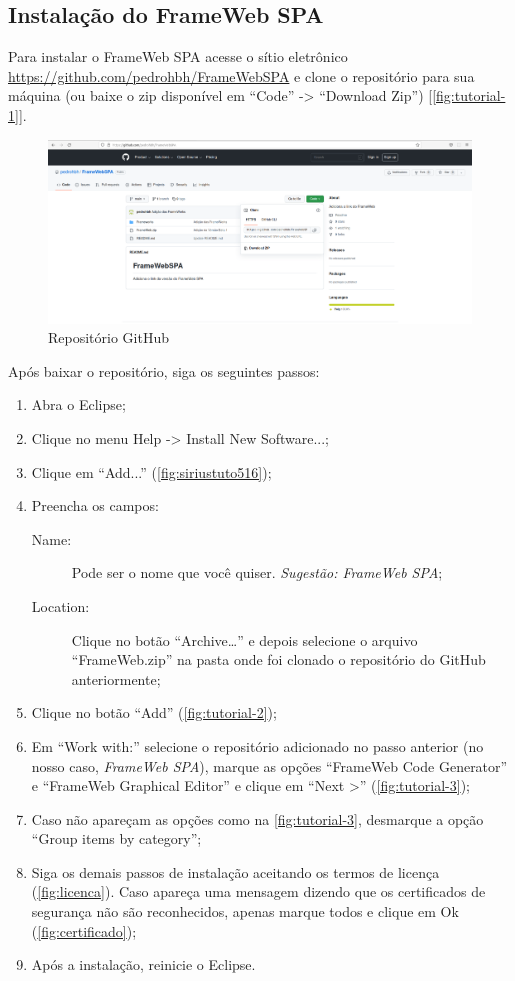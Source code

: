 \documentclass[
article,			%
11pt,				%
oneside,			%
a4paper,			%
english,			%
brazil,				%
sumario=tradicional
]{abntex2}
\begin{document}
\subsection{Instalação do FrameWeb SPA}
Para instalar o FrameWeb SPA acesse o sítio eletrônico \url{https://github.com/pedrohbh/FrameWebSPA} e clone o repositório para sua máquina (ou baixe o zip disponível em ``Code'' -> ``Download Zip'') [\autoref{fig:tutorial-1}].

\begin{figure}
	\centering
	\includegraphics[width=\linewidth]{"figuras/Tutorial 1"}
	\caption{Repositório GitHub}
	\label{fig:tutorial-1}
\end{figure}

Após baixar o repositório, siga os seguintes passos:
\begin{enumerate}
	\item Abra o Eclipse;
	\item Clique no menu Help -> Install New Software...;
	\item Clique em ``Add...'' (\autoref{fig:siriustuto516});
	\item Preencha os campos:
	\begin{description}
		\item[Name:] Pode ser o nome que você quiser. \textit{Sugestão: FrameWeb SPA};
		\item[Location:] Clique no botão ``Archive…'' e depois selecione o arquivo ``FrameWeb.zip'' na pasta onde foi clonado o repositório do GitHub anteriormente;
	\end{description}
	\item Clique no botão ``Add'' (\autoref{fig:tutorial-2});
	\item Em ``Work with:'' selecione o repositório adicionado no passo anterior (no nosso caso, \textit{FrameWeb SPA}), marque as opções ``FrameWeb Code Generator'' e ``FrameWeb Graphical Editor'' e clique em ``Next >'' (\autoref{fig:tutorial-3});
	\item Caso não apareçam as opções como na \autoref{fig:tutorial-3}, desmarque a opção ``Group items by category'';
	\item Siga os demais passos de instalação aceitando os termos de licença (\autoref{fig:licenca}). Caso apareça uma mensagem dizendo que os certificados de segurança não são reconhecidos, apenas marque todos e clique em Ok (\autoref{fig:certificado});
	\item Após a instalação, reinicie o Eclipse.
\end{enumerate}
\end{document}
